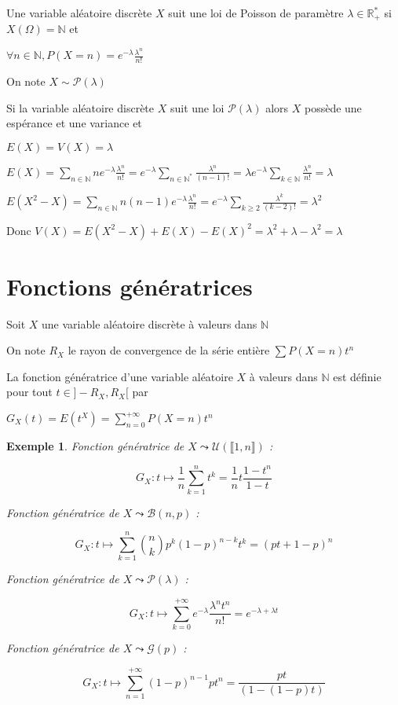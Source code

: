 \documentclass[a4paper,12pt]{book}
\newcommand{\Def}[2]{\begin{tcolorbox}[sharp corners, colback=white,colframe=blue!90!black!75, title=Définition : #1]#2\end{tcolorbox}}
\newcommand{\Prop}[2]{\begin{tcolorbox}[sharp corners, colback=white,colframe=red!90!black!75, title=Proposition : #1]#2\end{tcolorbox}}
\newcommand{\Pre}[1]{\begin{tcolorbox}[sharp corners, colback=white,colframe=green!60!green!30!black!75, title=Preuve]#1\end{tcolorbox}}
\newtheorem{Exe}{Exemple}[section]
\def\R{\mathbb{R}}
\def\N{\mathbb{N}}
\begin{document}
\Def{Loi de Poisson}{Une variable aléatoire discrète $X$ suit une loi de Poisson de paramètre $\lambda\in\R_+^*$ si $X(\Omega)=\N$ et
\par\begin{center}$\forall n\in\N, P(X=n)=e^{-\lambda}\frac{\lambda^n}{n!}$\end{center}
\par On note $X\sim \mathcal{P}(\lambda)$}
\Prop{Espérance et variance d'une loi de Poisson}{Si la variable aléatoire discrète $X$ suit une loi $\mathcal{P}(\lambda)$ alors $X$ possède une espérance et une variance et
\par\begin{center}$E(X)=V(X)=\lambda$\end{center}}
\Pre{$E(X) =\sum\limits_{n\in\N}ne^{-\lambda}\frac{\lambda^n}{n!} =e^{-\lambda}\sum\limits_{n\in\N^*}\frac{\lambda^{n}}{(n-1)!} = \lambda e^{-\lambda}\sum\limits_{k\in\N}\frac{\lambda^n}{n!}=\lambda$
\par $E(X^2-X) = \sum\limits_{n\in\N}n(n-1)e^{-\lambda}\frac{\lambda^n}{n!}=e^{-\lambda}\sum\limits_{k\geq 2}\frac{\lambda^{k}}{(k-2)!}=\lambda^2$
\par Donc $V(X) =  E(X^2 - X) + E(X) - E(X)^2 = \lambda^2 + \lambda - \lambda^2 =\lambda$}



\section{Fonctions génératrices}
Soit $X$ une variable aléatoire discrète à valeurs dans $\N$
\Def{}{On note $R_X$ le rayon de convergence de la série entière $\sum P(X=n)t^n$
\par La fonction génératrice d'une variable aléatoire $X$ à valeurs dans $\N$ est définie pour tout $t\in]-R_X,R_X[$ par
\par\begin{center}$G_X(t)=E(t^X)=\sum\limits_{n=0}^{+\infty}P(X=n)t^n$\end{center}}
\begin{Exe}
Fonction génératrice de $X\leadsto\mathcal{U}(\llbracket 1,n\rrbracket)$ :
\par $$ G_X:t\mapsto \frac{1}{n}\sum\limits_{k=1}^nt^k = \frac{1}{n}t\frac{1-t^n}{1-t}$$
\par Fonction génératrice de $X\leadsto \mathcal{B}(n,p)$ :
\par $$G_X:t\mapsto \sum\limits_{k=1}^n\binom{n}{k}p^k(1-p)^{n-k}t^k = (pt+1-p)^n$$
\par Fonction génératrice de $X\leadsto\mathcal{P}(\lambda)$ :
\par $$G_X:t\mapsto \sum\limits_{k=0}^{+\infty}e^{-\lambda}\frac{\lambda^nt^n}{n!} = e^{-\lambda + \lambda t}$$
\par Fonction génératrice de $X\leadsto \mathcal{G}(p)$ :
\par $$G_X:t\mapsto \sum\limits_{n=1}^{+\infty}(1-p)^{n-1}pt^n = \frac{pt}{(1-(1-p)t)}$$
\end{Exe}
\end{document}
